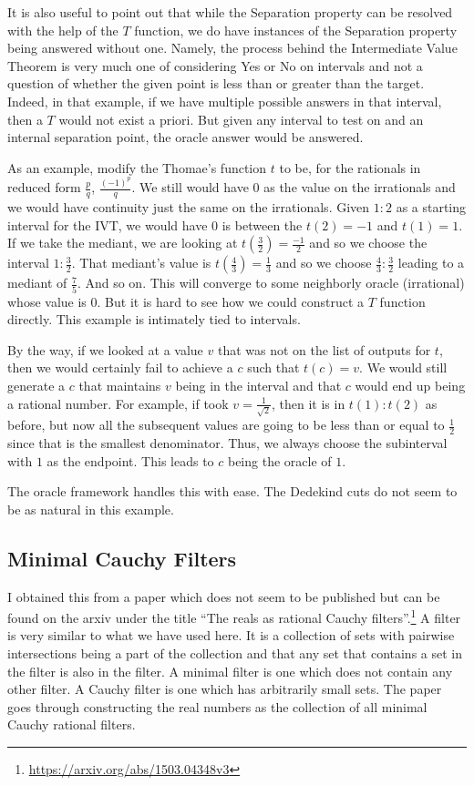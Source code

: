 \documentclass[12pt]{article}
\theoremstyle{remark}
\begin{document}
It is also useful to point out that while the Separation property can be resolved with the help of the $T$ function, we do have instances of the Separation property being answered without one. Namely, the process behind the Intermediate Value Theorem is very much one of considering Yes or No on intervals and not a question of whether the given point is less than or greater than the target. Indeed, in that example, if we have multiple possible answers in that interval, then a $T$ would not exist a priori. But given any interval to test on and an internal separation point, the oracle answer would be answered. 

As an example, modify the Thomae's function $t$ to be, for the rationals in reduced form $\frac{p}{q}$, $\frac{(-1)^p}{q}$. We still would have $0$ as the value on the irrationals and we would have continuity just the same on the irrationals. Given $1:2$ as a starting interval for the IVT, we would have $0$ is between the $t(2) = -1$ and $t(1) = 1$. If we take the mediant, we are looking at $t(\frac{3}{2}) = \frac{-1}{2}$ and so we choose the interval $1:\frac{3}{2}$. That mediant's value is $t(\frac{4}{3}) = \frac{1}{3}$ and so we choose $\frac{4}{3}:\frac{3}{2}$ leading to a mediant of $\frac{7}{5}$. And so on. This will converge to some neighborly oracle (irrational) whose value is $0$. But it is hard to see how we could construct a $T$ function directly. This example is intimately tied to intervals. 

By the way, if we looked at a value $v$ that was not on the list of outputs for $t$, then we would certainly fail to achieve a $c$ such that $t(c) = v$. We would still generate a $c$ that maintains $v$ being in the interval and that $c$ would end up being a rational number. For example, if took $v = \frac{1}{\sqrt{2}}$, then it is in $t(1):t(2)$ as before, but now all the subsequent values are going to be less than or equal to $\frac{1}{2}$ since that is the smallest denominator. Thus, we always choose the subinterval with $1$ as the endpoint. This leads to $c$ being the oracle of $1$. 

The oracle framework handles this with ease. The Dedekind cuts do not seem to be as natural in this example. 

\subsection{Minimal Cauchy Filters}

I obtained this from a paper which does not seem to be published but can be found on the arxiv under the title ``The reals as rational Cauchy filters''.\footnote{\url{https://arxiv.org/abs/1503.04348v3}} A filter is very similar to what we have used here. It is a collection of sets with pairwise intersections being a part of the collection and that any set that contains a set in the filter is also in the filter. A minimal filter is one which does not contain any other filter. A Cauchy filter is one which has arbitrarily small sets. The paper goes through constructing the real numbers as the collection of all minimal Cauchy rational filters. 
\end{document}
